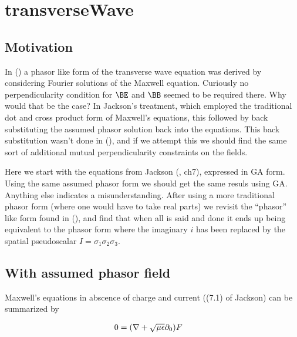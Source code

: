 

\chapter{transverseWave}
\label{chap:transverseWave}
{}
\date{August 6, 2009}

\beginArtWithToc

\section{Motivation}

In (\cite{maxwellVacuum}) a phasor like form of the transverse wave equation was derived by considering Fourier solutions of the Maxwell equation.  Curiously no perpendicularity condition for $\BE$ and $\BB$ seemed to be required there.  Why would that be the case?  In Jackson's treatment, which employed the traditional dot and cross product form of Maxwell's equations, this followed by back substituting the assumed phasor solution back into the equations.  This back substitution wasn't done in (\cite{maxwellVacuum}), and if we attempt this we should find the same sort of additional mutual perpendicularity constraints on the fields.

Here we start with the equations from Jackson (\cite{jackson1975cew}, ch7), expressed in GA form.  Using the same assumed phasor form we should get the same resuls using GA.  Anything else indicates a misunderstanding.  After using a more traditional phasor form (where one would have to take real parts) we revisit the ``phasor'' like form found in (\cite{maxwellVacuum}), and find that when all is said and done it ends up being equivalent to the phasor form where the imaginary $i$ has been replaced by the spatial pseudoscalar $I = \sigma_1\sigma_2\sigma_3$.

\section{With assumed phasor field}

Maxwell's equations in abscence of charge and current ((7.1) of Jackson) can be summarized by 

\begin{align}\label{eqn:foo1}
0 &= (\nabla + \sqrt{\mu\epsilon}\partial_0) F 
\end{align}

